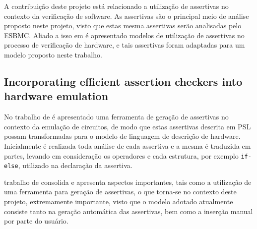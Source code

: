 \par
A contribuição deste projeto está relacionado a utilização de assertivas no contexto da verificação de software. As assertivas são o principal meio de análise proposto neste projeto, visto que estas mesma assertivas serão analisadas pelo ESBMC. Aliado a isso em \citeauthor{di2012use} é apresentado modelos de utilização de assertivas no processo de verificação de hardware, e tais assertivas foram adaptadas para um modelo proposto neste trabalho.

\subsection{Incorporating efficient assertion checkers into hardware emulation}
\par
No trabalho de \citeauthor{boule2005incorporating} é apresentado uma ferramenta de geração de assertivas no contexto da emulação de circuitos, de modo que estas assertivas descrita em PSL possam transformadas para o modelo de linguagem de descrição de hardware. Inicialmente é realizada toda análise de cada assertiva e a mesma é traduzida em partes, levando em consideração os operadores e cada estrutura, por exemplo \texttt{if-else}, utilizado na declaração da assertiva.


\par
trabalho de \citeauthor{boule2005incorporating} consolida e apresenta aspectos importantes, tais como a utilização de uma ferramenta para geração de assertivas, o que torna-se no contexto deste projeto, extremamente importante, visto que o modelo adotado atualmente consiste tanto na geração automática das assertivas, bem como a inserção manual por parte do usuário.